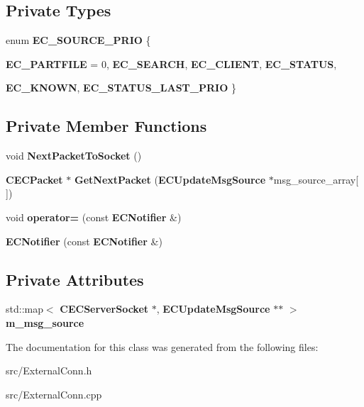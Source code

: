 \subsection*{Private Types}
\begin{DoxyCompactItemize}
\item 
enum {\bfseries EC\_\-SOURCE\_\-PRIO} \{ \par
{\bfseries EC\_\-PARTFILE} =  0, 
{\bfseries EC\_\-SEARCH}, 
{\bfseries EC\_\-CLIENT}, 
{\bfseries EC\_\-STATUS}, 
\par
{\bfseries EC\_\-KNOWN}, 
{\bfseries EC\_\-STATUS\_\-LAST\_\-PRIO}
 \}
\end{DoxyCompactItemize}
\subsection*{Private Member Functions}
\begin{DoxyCompactItemize}
\item 
void {\bfseries NextPacketToSocket} ()\label{classECNotifier_a825f61b40c2cb7944281d0455597006b}

\item 
{\bf CECPacket} $\ast$ {\bfseries GetNextPacket} ({\bf ECUpdateMsgSource} $\ast$msg\_\-source\_\-array[$\,$])\label{classECNotifier_a6b89b71a870b0b948858fc94e20ea6e7}

\item 
void {\bfseries operator=} (const {\bf ECNotifier} \&)\label{classECNotifier_a4ba8d6c29d971bc64d3d53bc02d359d9}

\item 
{\bfseries ECNotifier} (const {\bf ECNotifier} \&)\label{classECNotifier_a3c3ac804dbc5fe5553fa5d867428288b}

\end{DoxyCompactItemize}
\subsection*{Private Attributes}
\begin{DoxyCompactItemize}
\item 
std::map$<$ {\bf CECServerSocket} $\ast$, {\bf ECUpdateMsgSource} $\ast$$\ast$ $>$ {\bfseries m\_\-msg\_\-source}\label{classECNotifier_a1c3cb28ae80f1d9bdb2b8769d6497950}

\end{DoxyCompactItemize}


The documentation for this class was generated from the following files:\begin{DoxyCompactItemize}
\item 
src/ExternalConn.h\item 
src/ExternalConn.cpp\end{DoxyCompactItemize}
